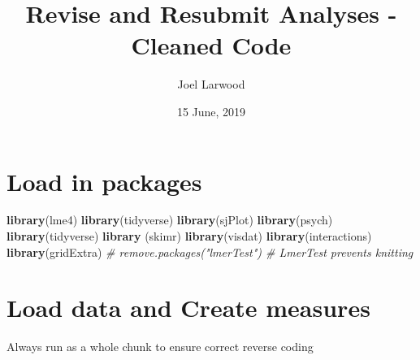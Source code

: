 \documentclass[]{article}
\title{Revise and Resubmit Analyses - Cleaned Code}
\author{Joel Larwood}
\date{15 June, 2019}
\newenvironment{Shaded}{\begin{snugshade}}{\end{snugshade}}
\newcommand{\CommentTok}[1]{\textcolor[rgb]{0.56,0.35,0.01}{\textit{#1}}}
\newcommand{\KeywordTok}[1]{\textcolor[rgb]{0.13,0.29,0.53}{\textbf{#1}}}
\newcommand{\NormalTok}[1]{#1}
\begin{document}
\maketitle

\hypertarget{load-in-packages}{%
\section{Load in packages}\label{load-in-packages}}

\begin{Shaded}
\begin{Highlighting}[]
\KeywordTok{library}\NormalTok{(lme4)}
\KeywordTok{library}\NormalTok{(tidyverse)}
\KeywordTok{library}\NormalTok{(sjPlot)}
\KeywordTok{library}\NormalTok{(psych)}
\KeywordTok{library}\NormalTok{(tidyverse)}
\KeywordTok{library}\NormalTok{ (skimr)}
\KeywordTok{library}\NormalTok{(visdat)}
\KeywordTok{library}\NormalTok{(interactions)}
\KeywordTok{library}\NormalTok{(gridExtra)}
\CommentTok{# remove.packages("lmerTest") # LmerTest prevents knitting }
\end{Highlighting}
\end{Shaded}

\hypertarget{load-data-and-create-measures}{%
\section{Load data and Create
measures}\label{load-data-and-create-measures}}

Always run as a whole chunk to ensure correct reverse coding
\end{document}
